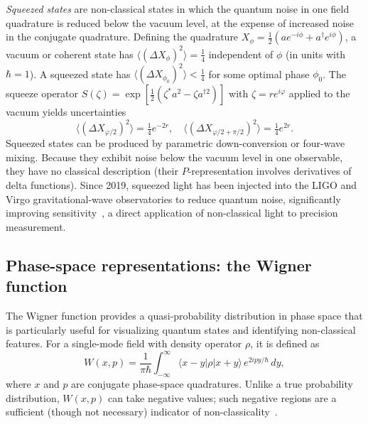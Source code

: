 \documentclass[%
 reprint,
 amsmath,amssymb,
 aps,
]{revtex4-2}
\begin{document}
\textit{Squeezed states} are non-classical states in which the quantum noise in one field quadrature is reduced below the vacuum level, at the expense of increased noise in the conjugate quadrature. Defining the quadrature $X_\phi = \tfrac{1}{2}(a e^{-i\phi} + a^\dagger e^{i\phi})$, a vacuum or coherent state has $\langle(\Delta X_\phi)^2\rangle = \tfrac{1}{4}$ independent of $\phi$ (in units with $\hbar = 1$). A squeezed state has $\langle(\Delta X_{\phi_0})^2\rangle < \tfrac{1}{4}$ for some optimal phase $\phi_0$. The squeeze operator $S(\zeta) = \exp[\tfrac{1}{2}(\zeta^* a^2 - \zeta a^{\dagger 2})]$ with $\zeta = r e^{i\varphi}$ applied to the vacuum yields uncertainties
\begin{equation}
\langle (\Delta X_{\varphi/2})^2 \rangle = \tfrac{1}{4} e^{-2r}, \quad
\langle (\Delta X_{\varphi/2 + \pi/2})^2 \rangle = \tfrac{1}{4} e^{2r}.
\label{eq:squeeze}
\end{equation}
Squeezed states can be produced by parametric down-conversion or four-wave mixing. Because they exhibit noise below the vacuum level in one observable, they have no classical description (their $P$-representation involves derivatives of delta functions). Since 2019, squeezed light has been injected into the LIGO and Virgo gravitational-wave observatories to reduce quantum noise, significantly improving sensitivity~\cite{aasi2013, tse2019}, a direct application of non-classical light to precision measurement.


\subsection{Phase-space representations: the Wigner function}
\label{sec:wigner}

The Wigner function provides a quasi-probability distribution in phase space that is particularly useful for visualizing quantum states and identifying non-classical features. For a single-mode field with density operator $\rho$, it is defined as~\cite{wigner1932}
\begin{equation}
W(x, p) = \frac{1}{\pi\hbar} \int_{-\infty}^{\infty} \langle x - y | \rho | x + y \rangle \, e^{2ipy/\hbar} \, dy,
\label{eq:wigner_def}
\end{equation}
where $x$ and $p$ are conjugate phase-space quadratures. Unlike a true probability distribution, $W(x,p)$ can take negative values; such negative regions are a sufficient (though not necessary) indicator of non-classicality~\cite{hudson1974}.
\end{document}
